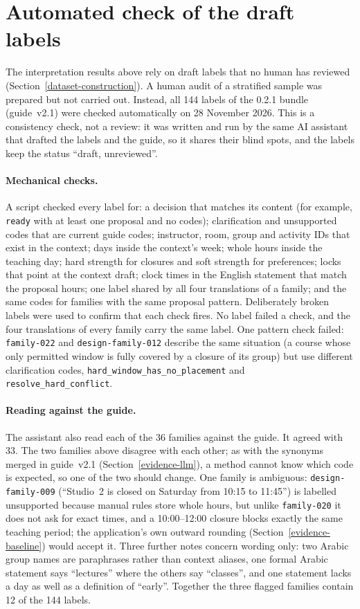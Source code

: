 \section{Automated check of the draft labels}\label{evidence-labelcheck}
The interpretation results above rely on draft labels that no human has reviewed (Section~\ref{dataset-construction}). A human audit of a stratified sample was prepared but not carried out. Instead, all 144 labels of the 0.2.1 bundle (guide~v2.1) were checked automatically on 28 November 2026. This is a consistency check, not a review: it was written and run by the same AI assistant that drafted the labels and the guide, so it shares their blind spots, and the labels keep the status ``draft, unreviewed''.

\paragraph{Mechanical checks.} A script checked every label for: a decision that matches its content (for example, \texttt{ready} with at least one proposal and no codes); clarification and unsupported codes that are current guide codes; instructor, room, group and activity IDs that exist in the context; days inside the context's week; whole hours inside the teaching day; hard strength for closures and soft strength for preferences; locks that point at the context draft; clock times in the English statement that match the proposal hours; one label shared by all four translations of a family; and the same codes for families with the same proposal pattern. Deliberately broken labels were used to confirm that each check fires. No label failed a check, and the four translations of every family carry the same label. One pattern check failed: \texttt{family-022} and \texttt{design-family-012} describe the same situation (a course whose only permitted window is fully covered by a closure of its group) but use different clarification codes, \texttt{hard\_window\_has\_no\_placement} and \texttt{resolve\_hard\_conflict}.

\paragraph{Reading against the guide.} The assistant also read each of the 36 families against the guide. It agreed with 33. The two families above disagree with each other; as with the synonyms merged in guide~v2.1 (Section~\ref{evidence-llm}), a method cannot know which code is expected, so one of the two should change. One family is ambiguous: \texttt{design-family-009} (``Studio~2 is closed on Saturday from 10:15 to 11:45'') is labelled unsupported because manual rules store whole hours, but unlike \texttt{family-020} it does not ask for exact times, and a 10:00--12:00 closure blocks exactly the same teaching period; the application's own outward rounding (Section~\ref{evidence-baseline}) would accept it. Three further notes concern wording only: two Arabic group names are paraphrases rather than context aliases, one formal Arabic statement says ``lectures'' where the others say ``classes'', and one statement lacks a day as well as a definition of ``early''. Together the three flagged families contain 12 of the 144 labels.

